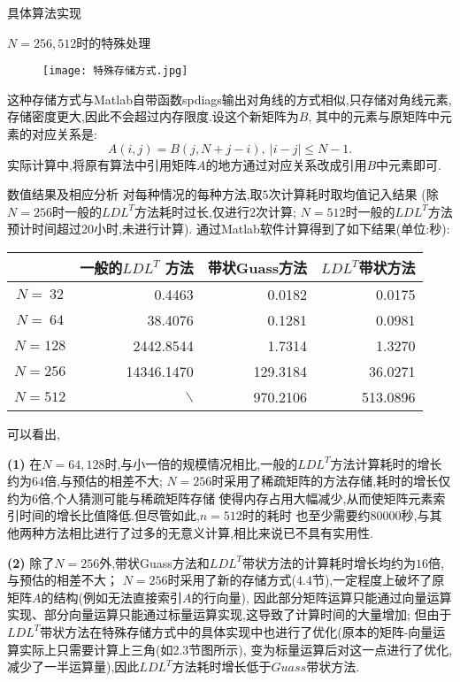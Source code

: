 \documentclass{article}
\begin{document}
\begin{section}{具体算法实现}
\begin{subsection}{$N=256,512$时的特殊处理}
        \begin{figure}[ht]
            \centering         
            \texttt{[image: 特殊存储方式.jpg]}
        \end{figure}

        这种存储方式与Matlab自带函数spdiags输出对角线的方式相似,只存储对角线元素,存储密度更大,因此不会超过内存限度.设这个新矩阵为$B$,
        其中的元素与原矩阵中元素的对应关系是:$$ A(i,j)=B(j,N+j-i),\ \left\lvert i-j\right\rvert \leq N-1.$$
        实际计算中,将原有算法中引用矩阵$A$的地方通过对应关系改成引用$B$中元素即可.

    \end{subsection}
\end{section}

\begin{section}{数值结果及相应分析}
    对每种情况的每种方法,取$5$次计算耗时取均值记入结果
    (除$N=256$时一般的$LDL^T$方法耗时过长,仅进行$2$次计算;
    $N=512$时一般的$LDL^T$方法预计时间超过20小时,未进行计算).
    通过Matlab软件计算得到了如下结果(单位:秒):
    \begin{table}[!ht]
        \centering
        \begin{tabular}{crrr}
        \toprule
            ~ & 一般的$LDL^T$ 方法 & 带状Guass方法 & $LDL^T$带状方法  \\ \midrule
            $N=\ 32$ & 0.4463 & \ \ 0.0182 & \ \ 0.0175 \\ 
            $N=\ 64$ & 38.4076 & \ \ 0.1281 & \ \ 0.0981 \\ 
            $N=128$ & 2442.8544 & \ \ 1.7314 & \ \ 1.3270  \\ 
            $N=256$ & 14346.1470 & 129.3184 & \ 36.0271  \\
            $N=512$ & $\backslash$ & 970.2106 & 513.0896 \\ 
        \bottomrule
        \end{tabular}
    \end{table}

    可以看出,

    \textbf{(1) } 在$N=64,128$时,与小一倍的规模情况相比,一般的$LDL^T$方法计算耗时的增长约为$64$倍,与预估的相差不大;
    $N=256$时采用了稀疏矩阵的方法存储,耗时的增长仅约为$6$倍,个人猜测可能与稀疏矩阵存储
    使得内存占用大幅减少,从而使矩阵元素索引时间的增长比值降低.但尽管如此,$n=512$时的耗时
    也至少需要约$80000$秒,与其他两种方法相比进行了过多的无意义计算,相比来说已不具有实用性.

    \textbf{(2) }除了$N=256$外,带状Guass方法和$LDL^T$带状方法的计算耗时增长均约为$16$倍,与预估的相差不大；
    $N=256$时采用了新的存储方式(4.4节),一定程度上破坏了原矩阵$A$的结构(例如无法直接索引$A$的行向量),
    因此部分矩阵运算只能通过向量运算实现、部分向量运算只能通过标量运算实现,这导致了计算时间的大量增加;
    但由于$LDL^T$带状方法在特殊存储方式中的具体实现中也进行了优化(原本的矩阵-向量运算实际上只需要计算上三角(如2.3节图所示),
    变为标量运算后对这一点进行了优化,减少了一半运算量),因此$LDL^T$方法耗时增长低于$Guass$带状方法.


\end{section}
\end{document}
